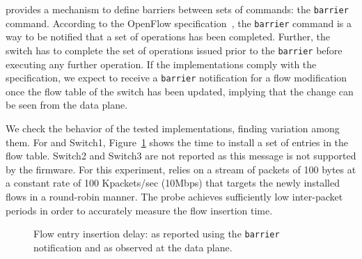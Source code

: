 \of provides a mechanism to define barriers between sets of commands: the
\texttt{barrier} command. According to the OpenFlow
specification~\cite{openflow-spec}, the \texttt{barrier} command is a way to be
notified that a set of \of operations has been completed. Further, the switch
has to complete the set of operations issued prior to the \texttt{barrier}
before executing any further operation. If the \of implementations comply with
the specification, we expect to receive a \texttt{barrier} notification for a
flow modification once the flow table of the switch has been updated, implying
that the change can be seen from the data plane.

We check the behavior of the tested \of implementations, finding variation among
them. For \ovs and Switch1, Figure~\ref{fig:flow_insertion_comparison} shows the
time to install a set of entries in the flow table. Switch2 and Switch3 are not
reported as this \of message is not supported by the firmware.  For this
experiment, \oflops relies on a stream of packets of 100 bytes at a constant
rate of 100 Kpackets/sec (10Mbps) that targets the newly installed flows in a
round-robin manner. The probe achieves sufficiently low inter-packet periods in
order to accurately measure the flow insertion time.

\begin{figure}[ht]
  \begin{center}
  \end{center}
  \caption{Flow entry insertion delay: as reported using the
    \texttt{barrier} notification and as observed at the data
    plane.}
  \label{fig:flow_insertion_comparison}
\end{figure}


